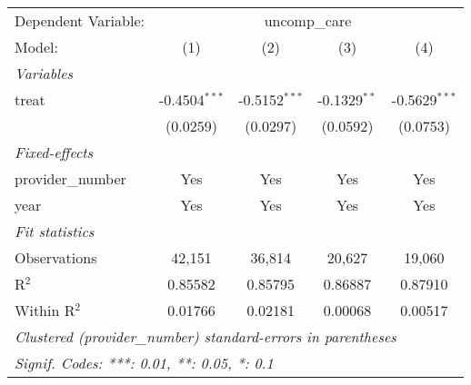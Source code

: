 
\begingroup
\centering
\begin{tabular}{lcccc}
   \tabularnewline \midrule \midrule
   Dependent Variable: & \multicolumn{4}{c}{uncomp\_care}\\
   Model:            & (1)             & (2)             & (3)            & (4)\\  
   \midrule
   \emph{Variables}\\
   treat             & -0.4504$^{***}$ & -0.5152$^{***}$ & -0.1329$^{**}$ & -0.5629$^{***}$\\   
                     & (0.0259)        & (0.0297)        & (0.0592)       & (0.0753)\\   
   \midrule
   \emph{Fixed-effects}\\
   provider\_number  & Yes             & Yes             & Yes            & Yes\\  
   year              & Yes             & Yes             & Yes            & Yes\\  
   \midrule
   \emph{Fit statistics}\\
   Observations      & 42,151          & 36,814          & 20,627         & 19,060\\  
   R$^2$             & 0.85582         & 0.85795         & 0.86887        & 0.87910\\  
   Within R$^2$      & 0.01766         & 0.02181         & 0.00068        & 0.00517\\  
   \midrule \midrule
   \multicolumn{5}{l}{\emph{Clustered (provider\_number) standard-errors in parentheses}}\\
   \multicolumn{5}{l}{\emph{Signif. Codes: ***: 0.01, **: 0.05, *: 0.1}}\\
\end{tabular}
\par\endgroup


